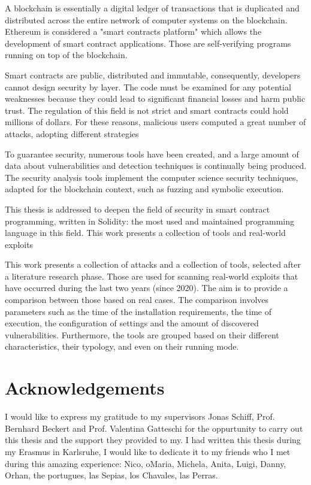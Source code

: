 
\Abstract
A blockchain is essentially a digital ledger of transactions that is duplicated and distributed across the entire network of computer systems on the blockchain.
Ethereum is considered a "smart contracts platform" which allows the development of smart contract applications.
Those are self-verifying programs running on top of the blockchain.

Smart contracts are public, distributed and immutable, consequently, developers cannot design security by layer.
The code must be examined for any potential weaknesses because they could lead to significant financial losses and harm public trust. 
The regulation of this field is not strict and smart contracts could hold millions of dollars.
For these reasons, malicious users computed a great number of attacks, adopting different strategies

To guarantee security, numerous tools have been created, and a large amount of data about vulnerabilities and detection techniques is continually being produced.
The security analysis tools implement the computer science security techniques, adapted for the blockchain context, such as fuzzing and symbolic execution.

This thesis is addressed to deepen the field of security in smart contract programming, written in Solidity: 
the most used and maintained programming language in this field.
This work presents a collection of tools and real-world exploits 

This work presents a collection of attacks and a collection of tools, selected after a literature research phase. 
Those are used for scanning real-world exploits that have occurred during the last two years (since 2020).
The aim is to provide a comparison between those based on real cases. 
The comparison involves parameters such as the time of the installation requirements, the time of execution, the configuration of settings and the amount of discovered vulnerabilities.
Furthermore, the tools are grouped based on their different characteristics, their typology, and even on their running mode. 


\chapter* {Acknowledgements}
I would like to express my gratitude to my supervisors Jonas Schiff, Prof. Bernhard Beckert and Prof. Valentina Gatteschi
for the oppurtunity to carry out this thesis and the support they provided to my.
I had written this thesis during my Erasmus in Karlsruhe, I would like to dedicate it to my friends who I met during this amazing experience:
Nico, oMaria, Michela, Anita, Luigi, Danny, Orhan, the portugues, las Sepias, los Chavales, las Perras.
